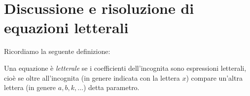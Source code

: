 \vspazio\ovalbox{\risolvii \ref{ese:3.39}, \ref{ese:3.40}, \ref{ese:3.41}, \ref{ese:3.42}, \ref{ese:3.43}, \ref{ese:3.44}, \ref{ese:3.45}, \ref{ese:3.46}, \ref{ese:3.47}, \ref{ese:3.48}, \ref{ese:3.49}, \ref{ese:3.50}, \ref{ese:3.51},}

\vspazio\ovalbox{\ref{ese:3.52}, \ref{ese:3.53}}

\section{Discussione e risoluzione di equazioni letterali}
Ricordiamo la seguente definizione:
\begin{definizione}
Una equazione è \emph{letterale} se i coefficienti dell’incognita sono espressioni letterali, cioè se oltre all’incognita (in genere indicata con
la lettera $x$) compare un’altra lettera (in genere $a, b, k, \ldots$) detta parametro.
\end{definizione}

